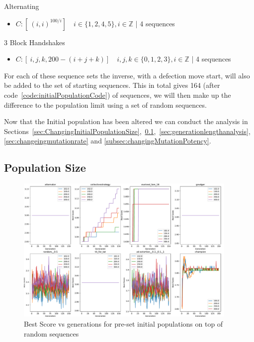 Alternating
\begin{itemize}
    \item \(C:[\ (i,i)^{100/i}] \quad i \in \{1,2,4,5\}, i \in \mathbb{Z}\) | 4 sequences
\end{itemize}

3 Block Handshakes
\begin{itemize}
    \item \(C:[\ i,j,k,200-(i+j+k)] \quad i,j,k \in \{0,1,2,3\}, i \in \mathbb{Z}\) | 4 sequences
\end{itemize}

For each of these sequence sets the inverse, with a defection move start, will also be added to the set of starting sequences.
This in total gives 164 (after code~\ref{code:initialPopulationCode}) of sequences, we will then make up the difference to the population limit using a set of random sequences.

Now that the Initial population has been altered we can conduct the analysis in Sections~\ref{sec:ChangingInitialPopulationSize},~\ref{subsec:populationSize},~\ref{sec:generationlengthanalysis},~\ref{sec:changeingmutationrate} and \ref{subsec:changingMutationPotency}.

\subsection{Population Size}\label{subsec:populationSize}

\begin{figure}[ht]
    \includegraphics[width=0.95\textwidth, keepaspectratio, center]{./img/plots/NEW_INIT_POP_bs_v_gen_all_old.pdf}
    \caption{Best Score vs generations for pre-set initial populations on top of random sequences}\label{fig:NEW-INIT-POP-bs-v-gen-all}
\end{figure}

